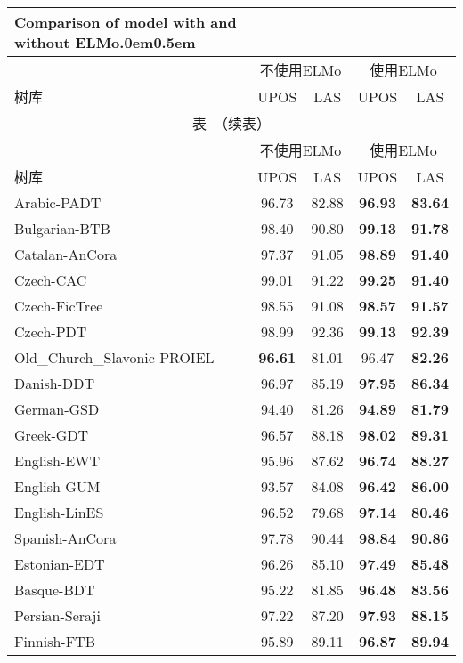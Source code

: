 \begin{longtable}{p{5cm}cccc}%
	\longbionenumcaption{}{在通用依存句法分析中使用ELMo的比较。}{Table $\!$}
	{}{Comparison of model with and without ELMo.\label{tbl:seq:main-result}}{0em}{0.5em}\\
	\toprule[1.5pt] & \multicolumn{2}{c}{不使用ELMo} & \multicolumn{2}{c}{使用ELMo} \\ 
	树库 & UPOS & LAS & UPOS & LAS \\
	\midrule[1pt]
	\endfirsthead
	\multicolumn{5}{c}{表~\thetable（续表）}\vspace{0.5em}\\
	\toprule[1.5pt] & \multicolumn{2}{c}{不使用ELMo} & \multicolumn{2}{c}{使用ELMo}   \\ 
	树库 & UPOS & LAS & UPOS & LAS \\
	\midrule[1pt]
	\endhead
	\bottomrule[1.5pt]
	\endfoot
Arabic-PADT & 96.73 & 82.88 & \bf 96.93 & \bf 83.64 \\
Bulgarian-BTB & 98.40 & 90.80 & \bf 99.13 & \bf 91.78 \\
Catalan-AnCora & 97.37 & 91.05 & \bf 98.89 & \bf 91.40 \\
Czech-CAC & 99.01 & 91.22 & \bf 99.25 & \bf 91.40 \\
Czech-FicTree & 98.55 & 91.08 & \bf 98.57 & \bf 91.57 \\
Czech-PDT & 98.99 & 92.36 & \bf 99.13 & \bf 92.39 \\
Old\_Church\_Slavonic-PROIEL & \bf 96.61 & 81.01 & 96.47 & \bf 82.26 \\
Danish-DDT & 96.97 & 85.19 & \bf 97.95 & \bf 86.34 \\
German-GSD & 94.40 & 81.26 & \bf 94.89 & \bf 81.79 \\
Greek-GDT & 96.57 & 88.18 & \bf 98.02 & \bf 89.31 \\
English-EWT & 95.96 & 87.62 & \bf 96.74 & \bf 88.27 \\
English-GUM & 93.57 & 84.08 & \bf 96.42 & \bf 86.00 \\
English-LinES & 96.52 & 79.68 & \bf 97.14 & \bf 80.46 \\
Spanish-AnCora & 97.78 & 90.44 & \bf 98.84 & \bf 90.86 \\
Estonian-EDT & 96.26 & 85.10 & \bf 97.49 & \bf 85.48 \\
Basque-BDT & 95.22 & 81.85 & \bf 96.48 & \bf 83.56 \\
Persian-Seraji & 97.22 & 87.20 & \bf 97.93 & \bf 88.15 \\
Finnish-FTB & 95.89 & 89.11 & \bf 96.87 & \bf 89.94 \\

\end{longtable}

